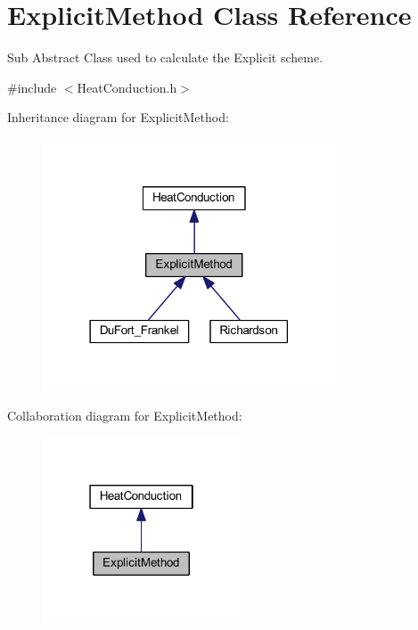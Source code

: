\hypertarget{class_explicit_method}{}\section{Explicit\+Method Class Reference}
\label{class_explicit_method}


Sub Abstract Class used to calculate the Explicit scheme.  




{\ttfamily \#include $<$Heat\+Conduction.\+h$>$}



Inheritance diagram for Explicit\+Method\+:\nopagebreak
\begin{figure}[H]
\begin{center}
\leavevmode
\includegraphics[width=246pt]{class_explicit_method__inherit__graph}
\end{center}
\end{figure}


Collaboration diagram for Explicit\+Method\+:\nopagebreak
\begin{figure}[H]
\begin{center}
\leavevmode
\includegraphics[width=166pt]{class_explicit_method__coll__graph}
\end{center}
\end{figure}
